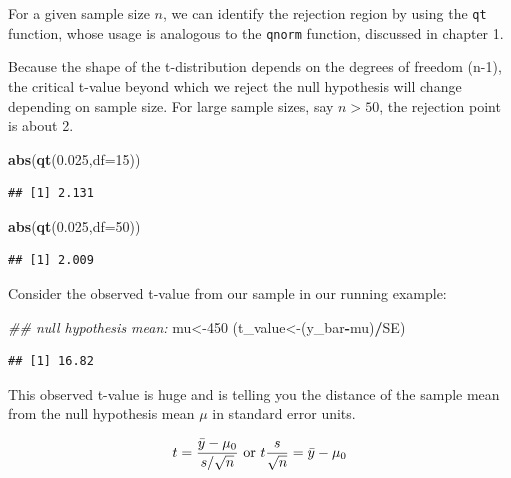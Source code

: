 \documentclass[12pt,]{krantz}
\newenvironment{Shaded}{\begin{snugshade}}{\end{snugshade}}
\newcommand{\CommentTok}[1]{\textcolor[rgb]{0.56,0.35,0.01}{\textit{#1}}}
\newcommand{\DataTypeTok}[1]{\textcolor[rgb]{0.13,0.29,0.53}{#1}}
\newcommand{\DecValTok}[1]{\textcolor[rgb]{0.00,0.00,0.81}{#1}}
\newcommand{\FloatTok}[1]{\textcolor[rgb]{0.00,0.00,0.81}{#1}}
\newcommand{\KeywordTok}[1]{\textcolor[rgb]{0.13,0.29,0.53}{\textbf{#1}}}
\newcommand{\NormalTok}[1]{#1}
\newcommand{\OperatorTok}[1]{\textcolor[rgb]{0.81,0.36,0.00}{\textbf{#1}}}
\begin{document}
For a given sample size \(n\), we can identify the rejection region by using the \texttt{qt} function, whose usage is analogous to the \texttt{qnorm} function, discussed in chapter 1.

Because the shape of the t-distribution depends on the degrees of freedom (n-1), the critical t-value beyond which we reject the null hypothesis will change depending on sample size. For large sample sizes, say \(n>50\), the rejection point is about 2.

\begin{Shaded}
\begin{Highlighting}[]
\KeywordTok{abs}\NormalTok{(}\KeywordTok{qt}\NormalTok{(}\FloatTok{0.025}\NormalTok{,}\DataTypeTok{df=}\DecValTok{15}\NormalTok{))}
\end{Highlighting}
\end{Shaded}

\begin{verbatim}
## [1] 2.131
\end{verbatim}

\begin{Shaded}
\begin{Highlighting}[]
\KeywordTok{abs}\NormalTok{(}\KeywordTok{qt}\NormalTok{(}\FloatTok{0.025}\NormalTok{,}\DataTypeTok{df=}\DecValTok{50}\NormalTok{))}
\end{Highlighting}
\end{Shaded}

\begin{verbatim}
## [1] 2.009
\end{verbatim}

Consider the observed t-value from our sample in our running example:

\begin{Shaded}
\begin{Highlighting}[]
\CommentTok{## null hypothesis mean:}
\NormalTok{mu<-}\DecValTok{450}
\NormalTok{(t_value<-(y_bar}\OperatorTok{-}\NormalTok{mu)}\OperatorTok{/}\NormalTok{SE)}
\end{Highlighting}
\end{Shaded}

\begin{verbatim}
## [1] 16.82
\end{verbatim}

This observed t-value is huge and is telling you the distance of the sample mean from the null hypothesis mean \(\mu\) in standard error units.

\begin{equation}
t=\frac{\bar{y}-\mu_0}{s/\sqrt{n}} \hbox{ or } t\frac{s}{\sqrt{n}}=\bar{y}-\mu_0
\end{equation}
\end{document}
